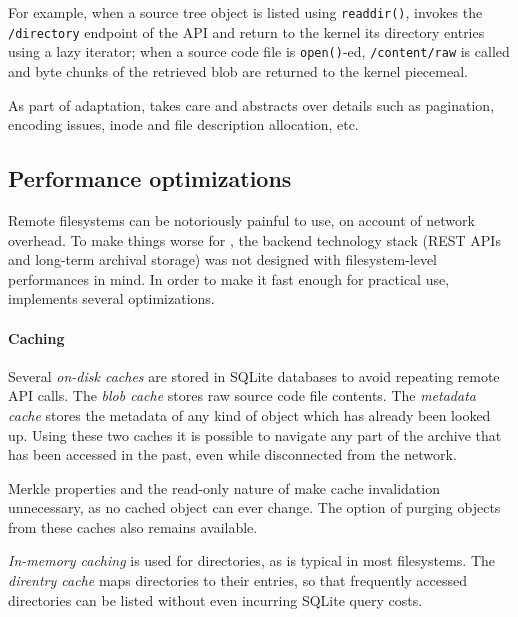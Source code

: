 For example, when a source tree object is listed using
\texttt{readdir()}, \SWHFS{} invokes the \texttt{/directory} endpoint of
the \SWH{} API and return to the kernel its directory entries using a lazy
iterator; when a source code file is \texttt{open()}-ed,
\texttt{/content/raw} is called and byte chunks of the retrieved blob are
returned to the kernel piecemeal.

As part of adaptation, \SWHFSpy{} takes care and abstracts over details such as
pagination, encoding issues, inode and file description allocation, etc.


\subsection{Performance optimizations}

Remote filesystems can be notoriously painful to use, on account of network
overhead.  To make things worse for \SWHFS, the backend technology stack (REST
APIs and long-term archival storage) was not designed with filesystem-level
performances in mind. In order to make it fast enough for practical use,
\SWHFS{} implements several optimizations.


\paragraph*{Caching}

Several \emph{on-disk caches} are stored in SQLite databases to avoid repeating
remote API calls.
The \emph{blob cache} stores raw source code file contents. The \emph{metadata
  cache} stores the metadata of any kind of object which has already been
  looked up. Using these two caches it is possible to navigate any part of the
  \SWH{} archive that has been accessed in the past, even while disconnected
  from the network.

Merkle properties and the read-only nature of \SWHFS{} make cache invalidation
unnecessary, as no cached object can ever change. The option of purging objects
from these caches also remains available.

\emph{In-memory caching} is used for directories, as is typical in most
filesystems. The \emph{direntry cache} maps directories to their entries, so
that frequently accessed directories can be listed without even incurring
SQLite query costs.


